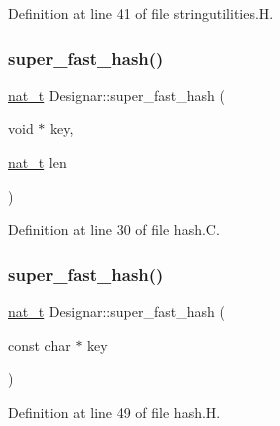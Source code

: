Definition at line 41 of file stringutilities.\+H.

\mbox{\label{namespace_designar_afd5712d16b3ae1c1c7d59f1004cd96fd}} 
\subsubsection{\texorpdfstring{super\+\_\+fast\+\_\+hash()}{super\_fast\_hash()}\hspace{0.1cm}{\footnotesize\ttfamily [1/5]}}
{\footnotesize\ttfamily \hyperlink{namespace_designar_aa72662848b9f4815e7bf31a7cf3e33d1}{nat\+\_\+t} Designar\+::super\+\_\+fast\+\_\+hash (\begin{DoxyParamCaption}\item[{void $\ast$}]{key,  }\item[{\hyperlink{namespace_designar_aa72662848b9f4815e7bf31a7cf3e33d1}{nat\+\_\+t}}]{len }\end{DoxyParamCaption})}



Definition at line 30 of file hash.\+C.

\mbox{\label{namespace_designar_a090aac15e358ba6f7db1b58d1fed363f}} 
\subsubsection{\texorpdfstring{super\+\_\+fast\+\_\+hash()}{super\_fast\_hash()}\hspace{0.1cm}{\footnotesize\ttfamily [2/5]}}
{\footnotesize\ttfamily \hyperlink{namespace_designar_aa72662848b9f4815e7bf31a7cf3e33d1}{nat\+\_\+t} Designar\+::super\+\_\+fast\+\_\+hash (\begin{DoxyParamCaption}\item[{const char $\ast$}]{key }\end{DoxyParamCaption})\hspace{0.3cm}{\ttfamily [inline]}}



Definition at line 49 of file hash.\+H.

\mbox{\label{namespace_designar_a289dc254d6e2caad30367f337eb6a04e}} 
